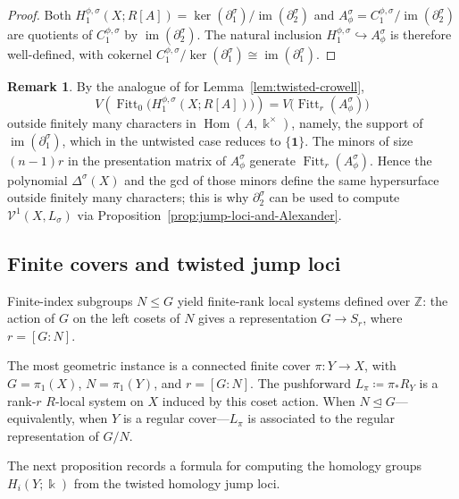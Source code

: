 \documentclass[11pt]{amsart}
\theoremstyle{definition}
\newtheorem{remark}[theorem]{Remark}
\newcommand{\Z}{\mathbb{Z}}
\newcommand{\bo}{\mathbf{1}}
\renewcommand{\k}{\Bbbk}
\newcommand{\VV}{\mathcal{V}}
\DeclareMathOperator{\im}{im}
\DeclareMathOperator{\Hom}{{Hom}}
\DeclareMathOperator{\Fitt}{{Fitt}}
\begin{document}
\begin{proof}
Both $H_1^{\phi,\sigma}(X;R[A])=\ker(\partial_1^\sigma)/\im(\partial_2^\sigma)$ 
and $A_\phi^\sigma=C_1^{\phi,\sigma}/\im(\partial_2^\sigma)$ are quotients 
of $C_1^{\phi,\sigma}$ by $\im(\partial_2^\sigma)$. The natural inclusion 
$H_1^{\phi,\sigma}\hookrightarrow A_\phi^\sigma$ is therefore well-defined, 
with cokernel $C_1^{\phi,\sigma}/\ker(\partial_1^\sigma)\cong\im(\partial_1^\sigma)$.
\end{proof}

\begin{remark}
\label{rem:fox-vs-invariant}
By the analogue of \cite[Prop.~2.2]{DPS-imrn} for 
Lemma~\ref{lem:twisted-crowell},
\[
V\!\left(\Fitt_0\bigl(H_1^{\phi,\sigma}(X;R[A])\bigr)\right) 
= V\bigl(\Fitt_r(A_\phi^\sigma)\bigr)
\]
outside finitely many characters in $\Hom(A,\k^\times)$, namely, 
the support of $\im(\partial_1^\sigma)$, which in the 
untwisted case reduces to $\{\bo\}$. 
The minors of size $(n-1)r$ in the presentation matrix of  $A_\phi^\sigma$   
generate $\Fitt_r(A_\phi^\sigma)$. 
Hence the polynomial $\Delta^\sigma(X)$ and the gcd of those minors 
define the same hypersurface outside finitely many characters; 
this is why $\partial_2^\sigma$ can be used to compute 
$\VV^1(X,L_\sigma)$ via 
Proposition~\ref{prop:jump-loci-and-Alexander}.
\end{remark}

\subsection{Finite covers and twisted jump loci}
\label{subsec:cjl-covers}

Finite-index subgroups $N\leq G$ yield finite-rank local systems
defined over $\Z$: the action of $G$ on the left cosets of $N$
gives a representation $G\to S_r$, where $r=[G\colon N]$.

The most geometric instance is a connected finite cover
$\pi\colon Y\to X$, with $G=\pi_1(X)$, $N=\pi_1(Y)$, and $r=[G\colon N]$.
The pushforward $L_\pi\coloneqq\pi_* R_Y$ is a rank-$r$ $R$-local system
on $X$ induced by this coset action. When $N\trianglelefteq G$---equivalently, 
when $Y$ is a regular cover---$L_\pi$ is associated to the regular 
representation of $G/N$.

The next proposition records a formula for computing the homology 
groups $H_i(Y;\k)$ from the twisted homology jump loci.
\end{document}

